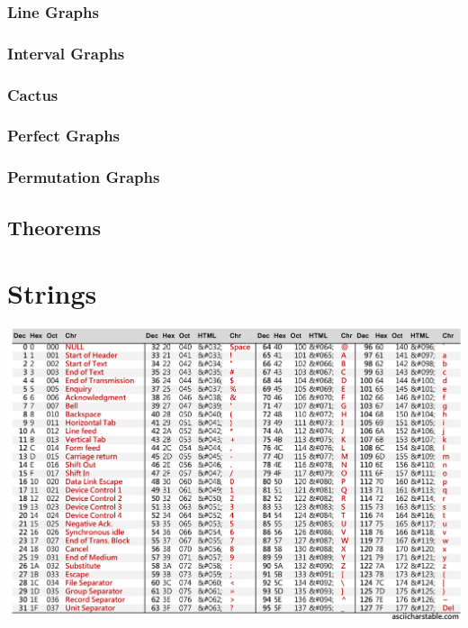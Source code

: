 \documentclass[10pt, twocolumn]{article}
\begin{document}
\begin{flushleft}
\subsubsection{Line Graphs}

\subsubsection{Interval Graphs}

\subsubsection{Cactus}

\subsubsection{Perfect Graphs}

\subsubsection{Permutation Graphs}

\subsection{Theorems}





\section{Strings}

\begin{center}
\includegraphics[scale=0.13]{ASCII-Table-wide.jpg}
\end{center}




\end{flushleft}
\end{document}
